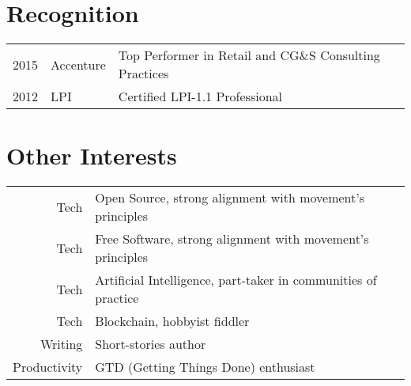 \documentclass[a4paper]{deedy-resume} %
\begin{document}
\begin{minipage}[t]{0.66\textwidth}
\section{Recognition	} 

\begin{tabular}{rll}
2015 & Accenture & Top Performer in Retail and CG\&S Consulting Practices\\
2012 & LPI 		 & Certified LPI-1.1 Professional

\end{tabular}

\sectionspace %


\section{Other Interests} 

\begin{tabular}{rl}
Tech & Open Source, strong alignment with movement's principles \\
Tech & Free Software, strong alignment with movement's principles \\
Tech & Artificial Intelligence, part-taker in communities of practice \\
Tech & Blockchain, hobbyist fiddler \\
Writing & Short-stories author \\
Productivity & GTD (Getting Things Done) enthusiast \\
\end{tabular}

\sectionspace %


\end{minipage} %



\end{document}
